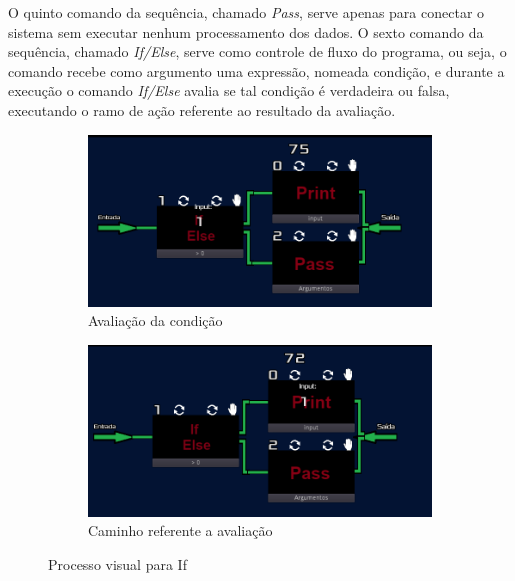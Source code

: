 O quinto comando da sequência, chamado \textit{Pass}, serve apenas para conectar
o sistema sem executar nenhum processamento dos dados.
O sexto comando da sequência, chamado \textit{If/Else}, serve como controle de 
fluxo do programa, ou seja, o comando recebe como argumento uma expressão, 
nomeada condição, e durante a execução o comando \textit{If/Else} avalia se 
tal condição é verdadeira ou falsa, executando o ramo de ação referente ao 
resultado da avaliação.

\begin{figure}[H]
    \centering
    \begin{subfigure}{0.48\textwidth}
        \centering
        \includegraphics[width=1\textwidth]{../figuras/avaliacao_if.png}
        \caption{Avaliação da condição}
    \end{subfigure}
    \begin{subfigure}{0.48\textwidth}
        \centering
        \includegraphics[width=1\textwidth]{../figuras/caminho_if.png}
        \caption{Caminho referente a avaliação}
    \end{subfigure}  
    \caption{Processo visual para If}
\end{figure}

